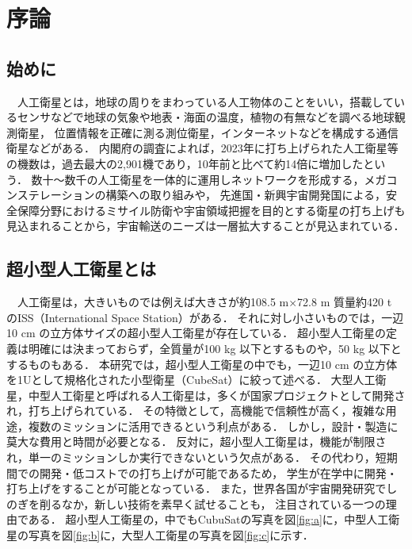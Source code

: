 \section{序論}
\subsection{始めに}
　人工衛星とは，地球の周りをまわっている人工物体のことをいい，搭載しているセンサなどで地球の気象や地表・海面の温度，植物の有無などを調べる地球観測衛星，
位置情報を正確に測る測位衛星，インターネットなどを構成する通信衛星などがある．
内閣府の調査によれば，2023年に打ち上げられた人工衛星等の機数は，過去最大の2,901機であり，10年前と比べて約14倍に増加したという\cite{intro1}．
数十～数千の人工衛星を一体的に運用しネットワークを形成する，メガコンステレーションの構築への取り組みや，
先進国・新興宇宙開発国による，安全保障分野におけるミサイル防衛や宇宙領域把握を目的とする衛星の打ち上げも見込まれることから，宇宙輸送のニーズは一層拡大することが見込まれている．


\subsection{超小型人工衛星とは}
　人工衛星は，大きいものでは例えば大きさが約108.5 m×72.8 m 質量約420 t のISS（International Space Station）がある\cite{intro2}．
それに対し小さいものでは，一辺10 cm の立方体サイズの超小型人工衛星が存在している．
超小型人工衛星の定義は明確には決まっておらず，全質量が100 kg 以下とするものや，50 kg 以下とするものもある．
本研究では，超小型人工衛星の中でも，一辺10 cm の立方体を1Uとして規格化された小型衛星（CubeSat）に絞って述べる．
大型人工衛星，中型人工衛星と呼ばれる人工衛星は，多くが国家プロジェクトとして開発され，打ち上げられている．
その特徴として，高機能で信頼性が高く，複雑な用途，複数のミッションに活用できるという利点がある．
しかし，設計・製造に莫大な費用と時間が必要となる．
反対に，超小型人工衛星は，機能が制限され，単一のミッションしか実行できないという欠点がある．
その代わり，短期間での開発・低コストでの打ち上げが可能であるため，
学生が在学中に開発・打ち上げをすることが可能となっている．
また，世界各国が宇宙開発研究でしのぎを削るなか，新しい技術を素早く試せることも，
注目されている一つの理由である．
超小型人工衛星の，中でもCubuSatの写真を図\ref{fig:a}\cite{micro}に，中型人工衛星の写真を図\ref{fig:b}\cite{medium}に，大型人工衛星の写真を図\ref{fig:c}\cite{large}に示す．

